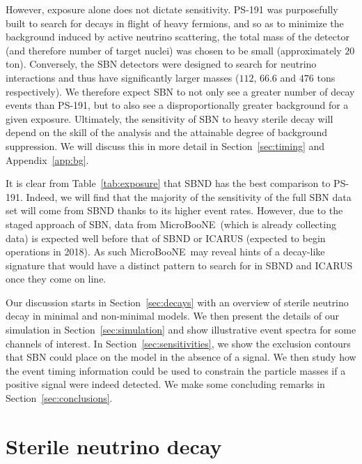 \documentclass[11pt, a4paper]{article}
\newcommand{\refsec}[1]{Section~\ref{#1}}
\newcommand{\refapp}[1]{Appendix~\ref{#1}}
\newcommand{\reftab}[1]{Table~\ref{#1}}
\def\muboone{MicroBooNE}
\begin{document}
However, exposure alone does not dictate sensitivity. PS-191 was purposefully
built to search for decays in flight of heavy fermions, and so as to minimize
the background induced by active neutrino scattering, the total mass of the
detector (and therefore number of target nuclei) was chosen to be small
(approximately $20$ ton). Conversely, the SBN detectors were designed to search
for neutrino interactions and thus have significantly larger masses ($112$,
$66.6$ and $476$ tons respectively).  We therefore expect SBN to not only see a
greater number of decay events than PS-191, but to also see a disproportionally
greater background for a given exposure.
%
Ultimately, the sensitivity of SBN to heavy sterile decay will depend on the
skill of the analysis and the attainable degree of background suppression. We
will discuss this in more detail in \refsec{sec:timing} and \refapp{app:bg}.

It is clear from \reftab{tab:exposure} that SBND has the best comparison to
PS-191. Indeed, we will find that the majority of the sensitivity of the full
SBN data set will come from SBND thanks to its higher event rates. However, due
to the staged approach of SBN, data from \muboone\ (which is already collecting
data) is expected well before that of SBND or ICARUS (expected to begin
operations in 2018). As such \muboone\ may reveal hints of a decay-like
signature that would have a distinct pattern to search for in SBND and ICARUS
once they come on line.

Our discussion starts in \refsec{sec:decays} with an overview of sterile
neutrino decay in minimal and non-minimal models. We then present the details
of our simulation in \refsec{sec:simulation} and show illustrative event
spectra for some channels of interest. In \refsec{sec:sensitivities}, we show
the exclusion contours that SBN could place on the model in the absence of a
signal. We then study how the event timing information could be used to
constrain the particle masses if a positive signal were indeed detected. We
make some concluding remarks in \refsec{sec:conclusions}.

\section{\label{sec:decays}Sterile neutrino decay}
\end{document}
